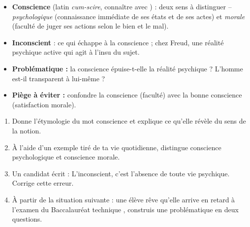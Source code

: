 \documentclass[11pt]{article}
\begin{document}
\begin{aretenir}
\begin{itemize}
\item \textbf{Conscience} (latin \emph{cum-scire}, \og connaître avec \fg) : deux sens à distinguer -- \emph{psychologique} (connaissance immédiate de ses états et de ses actes) et \emph{morale} (faculté de juger ses actions selon le bien et le mal).
\item \textbf{Inconscient} : ce qui échappe à la conscience ; chez Freud, une réalité psychique active qui agit à l'insu du sujet.
\item \textbf{Problématique :} la conscience épuise-t-elle la réalité psychique ? L'homme est-il transparent à lui-même ?
\item \textbf{Piège à éviter :} confondre la conscience (faculté) avec la bonne conscience (satisfaction morale).
\end{itemize}
\end{aretenir}

\begin{exercice}
\begin{enumerate}
\item Donne l'étymologie du mot \og conscience \fg{} et explique ce qu'elle révèle du sens de la notion.
\item À l'aide d'un exemple tiré de ta vie quotidienne, distingue conscience psychologique et conscience morale.
\item Un candidat écrit : \og L'inconscient, c'est l'absence de toute vie psychique. \fg{} Corrige cette erreur.
\item À partir de la situation suivante : \og une élève rêve qu'elle arrive en retard à l'examen du Baccalauréat technique \fg, construis une problématique en deux questions.
\end{enumerate}
\end{exercice}
\end{document}
